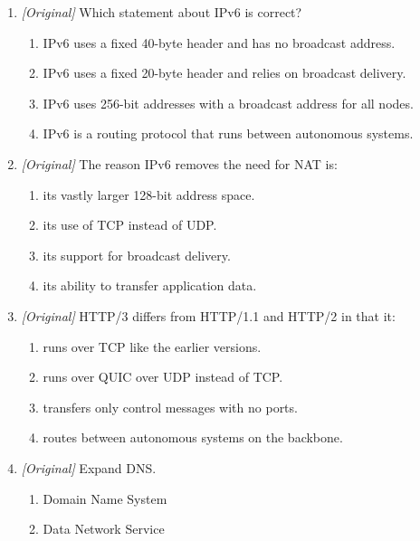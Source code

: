 \begin{enumerate}[label=\textbf{Q\arabic*.}, leftmargin=*]
  \begin{enumerate}[label=\Alph*.]
    \item 32-bit long.
    \item 64-bit long.
    \item 128-bit long.
    \item 256-bit long.
  \end{enumerate}
\item \textit{[Original]} Which statement about IPv6 is correct?
  \begin{enumerate}[label=\Alph*.]
    \item IPv6 uses a fixed 40-byte header and has no broadcast address.
    \item IPv6 uses a fixed 20-byte header and relies on broadcast delivery.
    \item IPv6 uses 256-bit addresses with a broadcast address for all nodes.
    \item IPv6 is a routing protocol that runs between autonomous systems.
  \end{enumerate}
\item \textit{[Original]} The reason IPv6 removes the need for NAT is:
  \begin{enumerate}[label=\Alph*.]
    \item its vastly larger 128-bit address space.
    \item its use of TCP instead of UDP.
    \item its support for broadcast delivery.
    \item its ability to transfer application data.
  \end{enumerate}
\item \textit{[Original]} HTTP/3 differs from HTTP/1.1 and HTTP/2 in that it:
  \begin{enumerate}[label=\Alph*.]
    \item runs over TCP like the earlier versions.
    \item runs over QUIC over UDP instead of TCP.
    \item transfers only control messages with no ports.
    \item routes between autonomous systems on the backbone.
  \end{enumerate}
\item \textit{[Original]} Expand DNS.
  \begin{enumerate}[label=\Alph*.]
    \item Domain Name System
    \item Data Network Service

\end{enumerate}
\end{enumerate}
